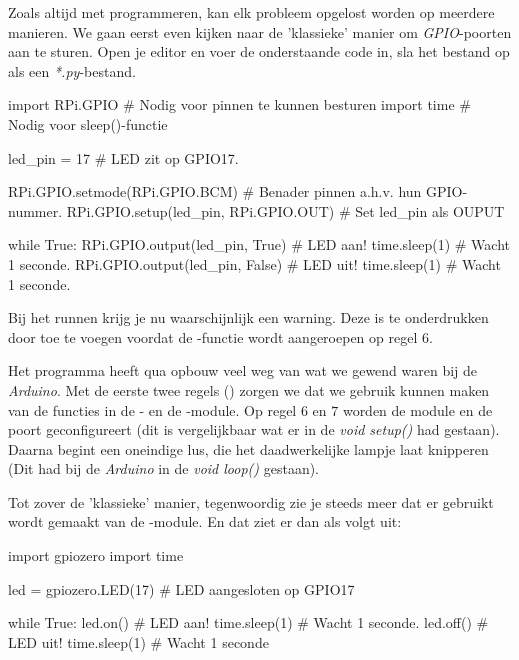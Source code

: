 Zoals altijd met programmeren, kan elk probleem opgelost worden op meerdere manieren. We gaan eerst even kijken naar de 'klassieke' manier om \textit{GPIO}-poorten aan te sturen. Open je editor en voer de onderstaande code in, sla het bestand op als een \textit{*.py}-bestand.

\begin{python}
import RPi.GPIO  # Nodig voor pinnen te kunnen besturen
import time      # Nodig voor sleep()-functie

led_pin = 17     # LED zit op GPIO17.

RPi.GPIO.setmode(RPi.GPIO.BCM)         # Benader pinnen a.h.v. hun GPIO-nummer.
RPi.GPIO.setup(led_pin, RPi.GPIO.OUT)  # Set led_pin als OUPUT

while True:
    RPi.GPIO.output(led_pin, True)   # LED aan!
    time.sleep(1)                    # Wacht 1 seconde.
    RPi.GPIO.output(led_pin, False)  # LED uit!
    time.sleep(1)                    # Wacht 1 seconde.
\end{python}

\begin{remark}
Bij het runnen krijg je nu waarschijnlijk een warning. Deze is te onderdrukken door  toe te voegen voordat de -functie wordt aangeroepen op regel $6$.
\end{remark}

Het programma heeft qua opbouw veel weg van wat we gewend waren bij de \textit{Arduino}. Met de eerste twee regels () zorgen we dat we gebruik kunnen maken van de functies in de - en de -module. Op regel $6$ en $7$ worden de module en de poort geconfigureert (dit is vergelijkbaar wat er in de \textit{void setup()} had gestaan). Daarna begint een oneindige lus, die het daadwerkelijke lampje laat knipperen (Dit had bij de \textit{Arduino} in de \textit{void loop()} gestaan). \newline

Tot zover de 'klassieke' manier, tegenwoordig zie je steeds meer dat er gebruikt wordt gemaakt van de -module. En dat ziet er dan als volgt uit:
\begin{python}
import gpiozero
import time

led = gpiozero.LED(17)  # LED aangesloten op GPIO17
 
while True: 
    led.on()       # LED aan!
    time.sleep(1)  # Wacht 1 seconde.
    led.off()      # LED uit!
    time.sleep(1)  # Wacht 1 seconde
\end{python}


